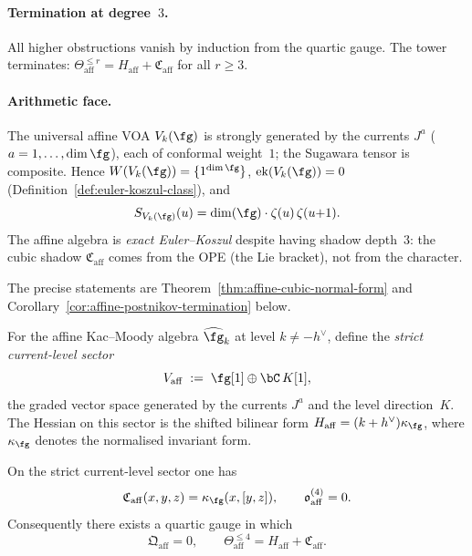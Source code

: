 \paragraph{Termination at degree~$3$.}
All higher obstructions vanish by induction from the quartic
gauge. The tower terminates:
$\Theta_{\mathrm{aff}}^{\leq r}
= H_{\mathrm{aff}} + \mathfrak{C}_{\mathrm{aff}}$
for all $r \geq 3$.

\paragraph{Arithmetic face.}
The universal affine VOA $V_k(\fg)$ is strongly generated by the
currents $J^a$ ($a = 1,\ldots,\dim\fg$), each of conformal
weight~$1$; the Sugawara tensor is composite. Hence
$W(V_k(\fg)) = \{1^{\dim\fg}\}$,
$\operatorname{ek}(V_k(\fg)) = 0$
(Definition~\ref{def:euler-koszul-class}), and
\[
S_{V_k(\fg)}(u) = \dim(\fg)\cdot\zeta(u)\,\zeta(u{+}1).
\]
The affine algebra is \emph{exact Euler--Koszul} despite having
shadow depth~$3$: the cubic shadow $\mathfrak{C}_{\mathrm{aff}}$
comes from the OPE (the Lie bracket), not from the character.

\medskip
The precise statements are
Theorem~\ref{thm:affine-cubic-normal-form} and
Corollary~\ref{cor:affine-postnikov-termination} below.

\begin{definition}%
\label{def:affine-strict-current-sector}
For the affine Kac--Moody algebra $\widehat{\fg}_k$ at level
$k \neq -h^\vee$, define the \emph{strict current-level sector}
\[
V_{\mathrm{aff}} \;:=\; \fg[1] \oplus \bC\,K[1],
\]
the graded vector space generated by the currents $J^a$ and the
level direction~$K$. The Hessian on this sector is the shifted
bilinear form $H_{\mathrm{aff}} = (k + h^\vee)\kappa_{\fg}$, where
\(\kappa_{\fg}\) denotes the normalised invariant form.
\end{definition}

\begin{theorem}\label{thm:affine-cubic-normal-form}
On the strict current-level sector one has
\[
\mathfrak{C}_{\mathrm{aff}}(x,y,z) = \kappa_{\fg}(x,[y,z]),
\qquad
\mathfrak{o}_{\mathrm{aff}}^{(4)} = 0.
\]
Consequently there exists a quartic gauge in which
\[
\mathfrak{Q}_{\mathrm{aff}} = 0,
\qquad
\Theta_{\mathrm{aff}}^{\le 4}
= H_{\mathrm{aff}} + \mathfrak{C}_{\mathrm{aff}}.
\]
\end{theorem}

